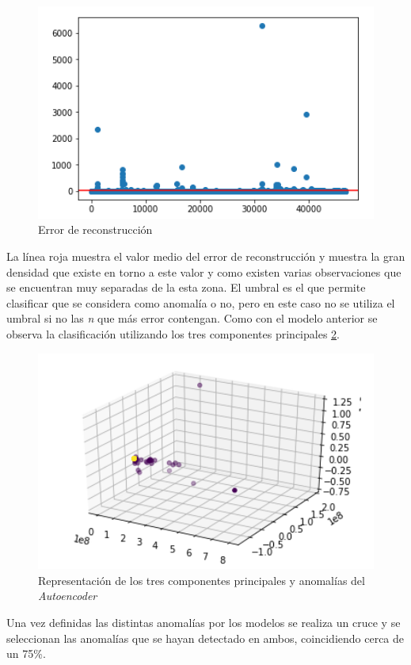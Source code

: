 \begin{figure}[h]
    \centering
    \includegraphics[width=12cm]{figs/error.PNG}
    \caption{Error de reconstrucción}
    \label{fig:error}
\end{figure}

La línea roja muestra el valor medio del error de reconstrucción y muestra la gran densidad que existe en torno a este valor y como existen varias observaciones que se encuentran muy separadas de la esta zona. El umbral es el que permite clasificar que se considera como anomalía o no, pero en este caso no se utiliza el umbral si no las \textit{n} que más error contengan. Como con el modelo anterior se observa la clasificación utilizando los tres componentes principales \ref{fig:pca_ae}.

\begin{figure}[H]
    \centering
    \includegraphics[width=12cm]{figs/pca_ae.PNG}
    \caption{Representación de los tres componentes principales y anomalías del \textit{Autoencoder}}
    \label{fig:pca_ae}
\end{figure}


Una vez definidas las distintas anomalías por los modelos se realiza un cruce y se seleccionan las anomalías que se hayan detectado en ambos, coincidiendo cerca de un 75\%.
